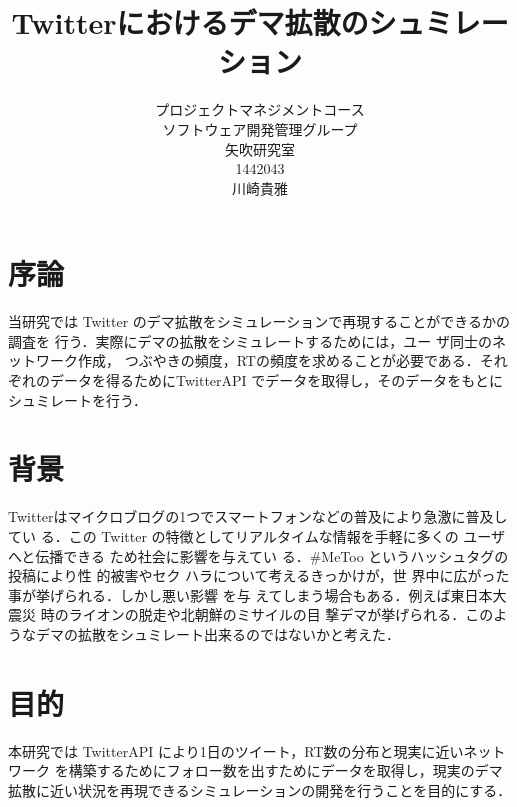 \title{Twitterにおけるデマ拡散のシュミレーション}
\author{プロジェクトマネジメントコース\\
ソフトウェア開発管理グループ\\
矢吹研究室\\
1442043\\
川崎貴雅}
\date{}

\maketitle



\tableofcontents%

\chapter{序論}
当研究では Twitter のデマ拡散をシミュレーションで再現することができるかの調査を 行う．実際にデマの拡散をシミュレートするためには，ユー ザ同士のネットワーク作成， つぶやきの頻度，RTの頻度を求めることが必要である．それぞれのデータを得るためにTwitterAPI でデータを取得し，そのデータをもとにシュミレートを行う．

\chapter{背景}

Twitterはマイクロブログの1つでスマートフォンなどの普及により急激に普及してい る．この Twitter の特徴としてリアルタイムな情報を手軽に多くの ユーザへと伝播できる ため社会に影響を与えてい る．\#MeToo というハッシュタグの投稿により性 的被害やセク ハラについて考えるきっかけが，世 界中に広がった事が挙げられる．しかし悪い影響 を与 えてしまう場合もある．例えば東日本大震災 時のライオンの脱走や北朝鮮のミサイルの目 撃デマが挙げられる．このようなデマの拡散をシュミレート出来るのではないかと考えた．


\chapter{目的}

本研究では TwitterAPI により1日のツイート，RT数の分布と現実に近いネットワーク を構築するためにフォロー数を出すためにデータを取得し，現実のデマ拡散に近い状況を再現できるシミュレーションの開発を行うことを目的にする．


